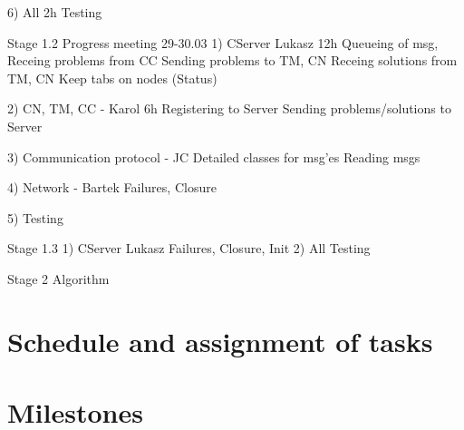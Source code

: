 \documentclass{article}
\begin{document}
6) All 2h
	Testing


Stage 1.2
Progress meeting 29-30.03
1) CServer Lukasz  12h
	Queueing of msg, 
	Receing problems from CC
	Sending problems to TM, CN
	Receing solutions from TM, CN
	Keep tabs on nodes (Status)

2) CN, TM, CC - Karol	6h
	Registering to Server
	Sending problems/solutions to Server
	
3) Communication protocol - JC
	Detailed classes for msg'es
	Reading msgs

4) Network - Bartek
	Failures, Closure
		
5) Testing

Stage 1.3
1) CServer Lukasz 
	Failures, Closure, Init
2) All Testing

Stage 2
Algorithm

\section{Schedule and assignment of tasks }

\section{Milestones }
\end{document}
